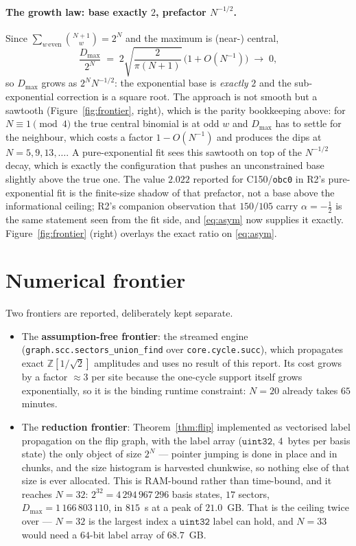 \documentclass[11pt]{article}
\newcommand{\rt}[1]{\texttt{#1}}
\newcommand{\fn}[1]{\texttt{#1}}
\theoremstyle{plain}
\theoremstyle{definition}
\begin{document}
\paragraph{The growth law: base exactly $2$, prefactor $N^{-1/2}$.}
Since $\sum_{w\,\mathrm{even}}\binom{N+1}{w} = 2^N$ and the maximum is (near-)
central,
\begin{equation}
  \frac{D_{\max}}{2^N} \;=\; 2\sqrt{\frac{2}{\pi (N+1)}}\,\bigl(1+O(N^{-1})\bigr)
  \;\longrightarrow\; 0 ,
  \label{eq:asym}
\end{equation}
so $D_{\max}$ grows as $2^N N^{-1/2}$: the exponential base is \emph{exactly} $2$
and the sub-exponential correction is a square root. The approach is not smooth
but a sawtooth (Figure~\ref{fig:frontier}, right), which is the parity
bookkeeping above: for $N\equiv1 \pmod 4$ the true central binomial is at odd $w$
and $D_{\max}$ has to settle for the neighbour, which costs a factor
$1-O(N^{-1})$ and produces the dips at $N=5,9,13,\ldots$. A pure-exponential fit
sees this sawtooth on top of the $N^{-1/2}$ decay, which is exactly the
configuration that pushes an unconstrained base slightly above the true one. The
value $2.022$ reported
for C150/\rt{obc0} in R2's pure-exponential fit is the finite-size shadow of that
prefactor, not a base above the informational ceiling; R2's companion observation
that $150/105$ carry $\alpha=-\tfrac12$ is the same statement seen from the fit
side, and \eqref{eq:asym} now supplies it exactly. Figure~\ref{fig:frontier}
(right) overlays the exact ratio on \eqref{eq:asym}.

\section{Numerical frontier}
\label{sec:frontier}

Two frontiers are reported, deliberately kept separate.

\begin{itemize}
\item The \textbf{assumption-free frontier}: the streamed engine
  (\fn{graph.scc.sectors\_union\_find} over \fn{core.cycle.succ}), which
  propagates exact $\mathbb{Z}[1/\sqrt2]$ amplitudes and uses no result of this
  report. Its cost grows by a factor $\approx 3$ per site because the one-cycle
  support itself grows exponentially, so it is the binding runtime constraint:
  $N=20$ already takes $65$ minutes.
\item The \textbf{reduction frontier}: Theorem~\ref{thm:flip} implemented as
  vectorised label propagation on the flip graph, with the label array
  ($\mathtt{uint32}$, $4$~bytes per basis state) the only object of size $2^N$ ---
  pointer jumping is done in place and in chunks, and the size histogram is
  harvested chunkwise, so nothing else of that size is ever allocated. This is
  RAM-bound rather than time-bound, and it reaches $N=32$: $2^{32} =
  4\,294\,967\,296$ basis states, $17$ sectors,
  $D_{\max} = 1\,166\,803\,110$, in $815$~s at a peak of $21.0$~GB. That is the
  ceiling twice over --- $N=32$ is the largest index a $\mathtt{uint32}$ label can
  hold, and $N=33$ would need a $64$-bit label array of $68.7$~GB.
\end{itemize}
\end{document}

